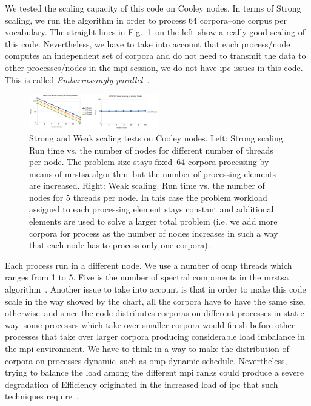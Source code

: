 \documentclass[10pt,journal,compsoc]{IEEEtran}
\begin{document}
We tested the scaling capacity of this code on Cooley nodes. In terms of Strong scaling, we run the algorithm in order to process 64 corpora--one corpus per vocabulary. The straight lines in Fig.~\ref{fig:MRSTSA_Scaling}--on the left--show a really good scaling of this code. Nevertheless, we have to take into account that each process/node computes an independent set of corpora and do not need to transmit the data to other processes/nodes in the \gls{mpi} session, we do not have \gls{ipc} issues in this code. This is called \emph{Embarrassingly parallel}~\cite{noauthor_embarrassingly_2018}. 

\begin{figure}[h!]
    \centering
    \includegraphics[width=0.5\textwidth]{MRSTSA_Scaling.png}
    \caption{Strong and Weak scaling tests on Cooley nodes. Left: Strong scaling. Run time vs. the number of nodes for different number of threads per node. The problem size stays fixed--64 corpora processing by means of \gls{mrstsa} algorithm--but the number of processing elements are increased. Right: Weak scaling. Run time vs. the number of nodes for 5 threads per node. In this case the problem workload assigned to each processing element stays constant and additional elements are used to solve a larger total problem (i.e. we add more corpora for process as the number of nodes increases in such a way that each node has to process only one corpora).}
    \label{fig:MRSTSA_Scaling}
\end{figure}

Each process run in a different node. We use a number of \gls{omp} threads which ranges from 1 to 5. Five is the number of spectral components in the \gls{mrstsa} algorithm~\cite{Dematties2018}. Another issue to take into account is that in order to make this code scale in the way showed by the chart, all the corpora have to have the same size, otherwise--and since the code distributes corporas on different processes in static way--some processes which take over smaller corpora would finish before other processes that take over larger corpora producing considerable load imbalance in the \gls{mpi} environment. We have to think in a way to make the distribution of corpora on processes dynamic--such as \gls{omp} dynamic schedule. Nevertheless, trying to balance the load among the different \gls{mpi} ranks could produce a severe degradation of Efficiency originated in the increased load of \gls{ipc} that such techniques require~\cite{hu2012biophysically}.
\end{document}
